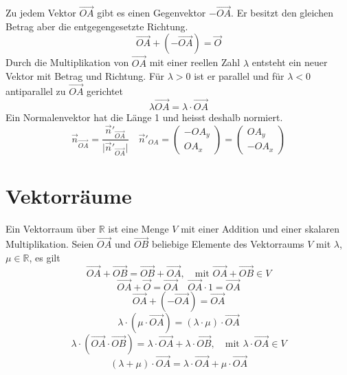 Zu jedem Vektor $\overrightarrow{OA}$ gibt es einen Gegenvektor $-\overrightarrow{OA}$. Er besitzt den gleichen Betrag aber die entgegengesetzte Richtung.
\begin{equation}
\boxed{\overrightarrow{OA}+\left(-\overrightarrow{OA}\right)=\overrightarrow{O}}
\end{equation}
Durch die Multiplikation von $\overrightarrow{OA}$ mit einer reellen Zahl $\lambda$ entsteht ein neuer Vektor mit Betrag und Richtung. Für $\lambda>0$ ist er parallel und für $\lambda<0$ antiparallel zu $\overrightarrow{OA}$ gerichtet
\begin{equation}
\boxed{\lambda\overrightarrow{OA}=\lambda\cdot \overrightarrow{OA}}
\end{equation}
Ein Normalenvektor hat die Länge 1 und heisst deshalb normiert.
\begin{equation}
\boxed{\overrightarrow{n}_{\overrightarrow{OA}}=\dfrac{\overrightarrow{n}'_{\overrightarrow{OA}}}{\Big\vert \overrightarrow{n}'_{\overrightarrow{OA}}\Big\vert}}\quad \boxed{\overrightarrow{n}'_{OA}=\begin{pmatrix}-OA_y\\OA_x\end{pmatrix}=\begin{pmatrix}OA_y\\-OA_x\end{pmatrix}}
\end{equation}
\section{Vektorräume}
Ein Vektorraum über $\mathbb{R}$ ist eine Menge $V$ mit einer Addition und einer skalaren Multiplikation. Seien $\overrightarrow{OA}$ und $\overrightarrow{OB}$ beliebige Elemente des Vektorraums $V$ mit $\lambda$, $\mu\in \mathbb{R}$, es gilt
\begin{equation}
\boxed{\overrightarrow{OA}+\overrightarrow{OB}=\overrightarrow{OB}+\overrightarrow{OA},\quad \text{mit }\overrightarrow{OA}+\overrightarrow{OB}\in V}
\end{equation}
\begin{equation}
\boxed{\overrightarrow{OA}+\overrightarrow{O}=\overrightarrow{OA}}\quad \boxed{\overrightarrow{OA}\cdot 1=\overrightarrow{OA}}
\end{equation}
\begin{equation}
\boxed{\overrightarrow{OA}+\left(-\overrightarrow{OA}\right)=\overrightarrow{OA}}
\end{equation}
\begin{equation}
\boxed{\lambda\cdot\left(\mu\cdot \overrightarrow{OA}\right)=\left(\lambda\cdot \mu\right)\cdot \overrightarrow{OA}}
\end{equation}
\begin{equation}
\boxed{\lambda\cdot \left(\overrightarrow{OA}\cdot \overrightarrow{OB}\right)=\lambda\cdot \overrightarrow{OA}+\lambda\cdot \overrightarrow{OB},\quad \text{mit }\lambda\cdot \overrightarrow{OA}\in V}
\end{equation}
\begin{equation}
\boxed{\left(\lambda+\mu\right)\cdot \overrightarrow{OA}=\lambda\cdot \overrightarrow{OA}+\mu\cdot \overrightarrow{OA}}
\end{equation}

